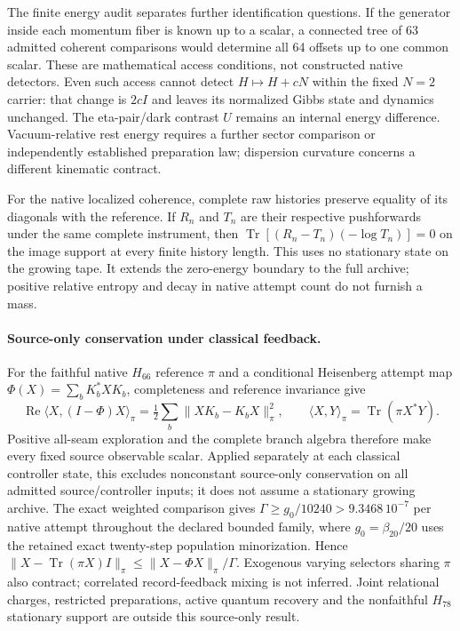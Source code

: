 The finite energy audit separates further identification questions. If
the generator inside each momentum fiber is known up to a scalar, a
connected tree of 63 admitted coherent comparisons would determine all
64 offsets up to one common scalar. These are mathematical access conditions,
not constructed native detectors. Even such access cannot detect $H\mapsto
H+cN$ within the fixed $N=2$ carrier: that change is $2cI$ and leaves its
normalized Gibbs state and dynamics unchanged. The eta-pair/dark contrast
$U$ remains an internal energy difference. Vacuum-relative rest energy
requires a further sector comparison or independently established preparation
law; dispersion curvature concerns a different kinematic contract.

For the native localized coherence, complete raw histories preserve equality
of its diagonals with the reference. If $R_n$ and $T_n$ are their respective
pushforwards under the same complete instrument, then
$\operatorname{Tr}[(R_n-T_n)(-\log T_n)]=0$ on the image support at every
finite history length. This uses no stationary state on the growing tape.
It extends the zero-energy boundary to the full archive; positive relative
entropy and decay in native attempt count do not furnish a mass.

\paragraph{Source-only conservation under classical feedback.}
For the faithful native $H_{66}$ reference $\pi$ and a conditional
Heisenberg attempt map $\Phi(X)=\sum_bK_b^*XK_b$, completeness and reference
invariance give
\[
 \operatorname{Re}\langle X,(I-\Phi)X\rangle_\pi
 =\tfrac12\sum_b\|XK_b-K_bX\|_\pi^2,
 \qquad \langle X,Y\rangle_\pi=\operatorname{Tr}(\pi X^*Y).
\]
Positive all-seam exploration and the complete branch algebra therefore
make every fixed source observable scalar. Applied separately at each
classical controller state, this excludes nonconstant source-only
conservation on all admitted source/controller inputs; it does not assume
a stationary growing archive. The exact weighted comparison gives
$\Gamma\ge g_0/10240>9.3468\,10^{-7}$ per native attempt throughout the
declared bounded family, where $g_0=\beta_{20}/20$ uses the retained exact
twenty-step population minorization. Hence
$\|X-\operatorname{Tr}(\pi X)I\|_\pi\le
\|X-\Phi X\|_\pi/\Gamma$.
Exogenous varying selectors sharing $\pi$ also contract; correlated
record-feedback mixing is not inferred. Joint relational charges,
restricted preparations, active quantum recovery and the nonfaithful
$H_{78}$ stationary support are outside this source-only result.
